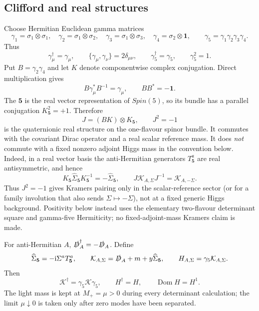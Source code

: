 \documentclass[11pt]{article}
\theoremstyle{definition}
\theoremstyle{remark}
\newcommand{\ii}{\mathrm i}
\begin{document}
\subsection{Clifford and real structures}

Choose Hermitian Euclidean gamma matrices
\begin{equation}
 \gamma_1=\sigma_1\otimes\sigma_1,\quad
 \gamma_2=\sigma_1\otimes\sigma_2,\quad
 \gamma_3=\sigma_1\otimes\sigma_3,\quad
 \gamma_4=\sigma_2\otimes\bm1,
 \qquad
 \gamma_5=\gamma_1\gamma_2\gamma_3\gamma_4.
 \label{eq:gamma-choice}
\end{equation}
Thus
\begin{equation}
 \gamma_\mu^\dagger=\gamma_\mu,\qquad
 \{\gamma_\mu,\gamma_\nu\}=2\delta_{\mu\nu},\qquad
 \gamma_5^\dagger=\gamma_5,\qquad \gamma_5^2=1.
 \label{eq:clifford-checks}
\end{equation}
Put \(B=\gamma_2\gamma_4\) and let \(K\) denote componentwise complex
conjugation.  Direct multiplication gives
\begin{equation}
 B\gamma_\mu^*B^{-1}=\gamma_\mu,\qquad BB^*=-\bm1.
 \label{eq:spin-reality}
\end{equation}
The \(\bm5\) is the real vector representation of \(Spin(5)\), so its
bundle has a parallel conjugation \(K_{\bm5}^2=+1\).  Therefore
\begin{equation}
 J=(BK)\otimes K_{\bm5},\qquad J^2=-1
 \label{eq:total-reality}
\end{equation}
is the quaternionic real structure on the one-flavour spinor bundle.  It
commutes with the covariant Dirac operator and a real scalar reference mass.
It does \emph{not} commute with a fixed nonzero adjoint Higgs mass in the
convention below.  Indeed, in a real vector basis the anti-Hermitian
generators \(T^a_{\bm5}\) are real antisymmetric, and hence
\begin{equation}
 K_{\bm5}\widehat\Sigma_{\bm5}K_{\bm5}^{-1}
 =-\widehat\Sigma_{\bm5},\qquad
 J\mathcal K_{A,\Sigma}J^{-1}=\mathcal K_{A,-\Sigma}.
 \label{eq:adjoint-reality-odd}
\end{equation}
Thus \(J^2=-1\) gives Kramers pairing only in the scalar-reference sector
(or for a family involution that also sends \(\Sigma\mapsto-\Sigma\)), not at
a fixed generic Higgs background.  Positivity below instead uses the
elementary two-flavour determinant square and gamma-five Hermiticity; no
fixed-adjoint-mass Kramers claim is made.

For anti-Hermitian \(A\), \(\slashed D_A^\dagger=-\slashed D_A\).  Define
\begin{equation}
 \widehat\Sigma_{\bm5}=-\ii\Sigma^aT^a_{\bm5},\qquad
 \mathcal K_{A,\Sigma}=\slashed D_A+m+y\widehat\Sigma_{\bm5},\qquad
 H_{A,\Sigma}=\gamma_5\mathcal K_{A,\Sigma}.
 \label{eq:fermion-H}
\end{equation}
Then
\begin{equation}
 \mathcal K^\dagger=\gamma_5\mathcal K\gamma_5,\qquad
 H^\dagger=H,\qquad \operatorname{Dom}H=H^1.
 \label{eq:gamma5-hermiticity}
\end{equation}
The light mass is kept at \(M_+=\mu>0\) during every determinant
calculation; the limit \(\mu\downarrow0\) is taken only after zero modes have
been separated.
\end{document}
